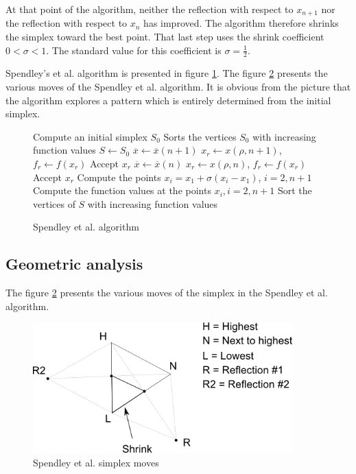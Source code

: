 At that point of the algorithm, neither the reflection with respect to 
$x_{n+1}$ nor the reflection with respect to $x_n$ has improved.
The algorithm therefore shrinks the simplex toward the best point.
That last step uses the shrink coefficient $0<\sigma<1$. The standard
value for this coefficient is $\sigma=\frac{1}{2}$.

Spendley's et al. algorithm is presented in figure \ref{algo-spendley}.
The figure \ref{fig-spendley-moves} presents the various 
moves of the Spendley et al. algorithm. It is obvious from the 
picture that the algorithm explores a pattern which is 
entirely determined from the initial simplex.

\begin{figure}[htbp]
\begin{algorithmic}
\STATE Compute an initial simplex $S_0$
\STATE Sorts the vertices $S_0$ with increasing function values
\STATE $S\gets S_0$
  \STATE $\overline{x}\gets \overline{x}(n+1)$
  \STATE $x_r \gets x(\rho,n+1)$, $f_r \gets f(x_r)$ 
    \STATE Accept $x_r$
  \ELSE
    \STATE $\overline{x}\gets \overline{x}(n)$
    \STATE $x_r \gets x(\rho,n)$, $f_r \gets f(x_r)$ 
      \STATE Accept $x_r$
    \ELSE 
      \STATE Compute the points $x_i=x_1 + \sigma (x_i - x_1)$, $i=2,n+1$ 
      \STATE Compute the function values at the points $x_i, i=2,n+1$
    \ENDIF
  \ENDIF
  \STATE Sort the vertices of $S$ with increasing function values
\ENDWHILE
\end{algorithmic}
\caption{Spendley et al. algorithm}
\label{algo-spendley}
\end{figure}

\subsection{Geometric analysis}

The figure \ref{fig-spendley-moves} presents the various moves of the 
simplex in the Spendley et al. algorithm.

\begin{figure}
\begin{center}
\includegraphics[width=10cm]{spendley-steps.png}
\end{center}
\caption{Spendley et al. simplex moves}
\label{fig-spendley-moves}
\end{figure}

